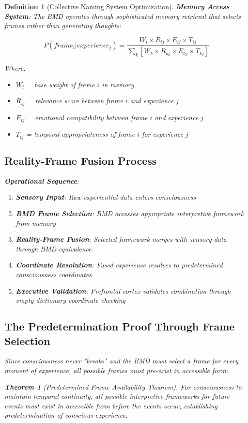 \documentclass[12pt]{article}
\newtheorem{theorem}{Theorem}
\newtheorem{definition}{Definition}
\begin{document}
\begin{definition}[Collective Naming System Optimization]
\textbf{Memory Access System}:
The BMD operates through sophisticated memory retrieval that selects frames rather than generating thoughts:

$$P(frame_i | experience_j) = \frac{W_i \times R_{ij} \times E_{ij} \times T_{ij}}{\sum_k[W_k \times R_{kj} \times E_{kj} \times T_{kj}]}$$

Where:
\begin{itemize}
\item $W_i$ = base weight of frame $i$ in memory
\item $R_{ij}$ = relevance score between frame $i$ and experience $j$
\item $E_{ij}$ = emotional compatibility between frame $i$ and experience $j$
\item $T_{ij}$ = temporal appropriateness of frame $i$ for experience $j$
\end{itemize}

\subsection{Reality-Frame Fusion Process}

\textbf{Operational Sequence}:
\begin{enumerate}
\item \textbf{Sensory Input}: Raw experiential data enters consciousness
\item \textbf{BMD Frame Selection}: BMD accesses appropriate interpretive framework from memory
\item \textbf{Reality-Frame Fusion}: Selected framework merges with sensory data through BMD equivalence
\item \textbf{Coordinate Resolution}: Fused experience resolves to predetermined consciousness coordinates
\item \textbf{Executive Validation}: Prefrontal cortex validates combination through empty dictionary coordinate checking
\end{enumerate}

\subsection{The Predetermination Proof Through Frame Selection}

Since consciousness never "breaks" and the BMD must select a frame for every moment of experience, all possible frames must pre-exist in accessible form:

\begin{theorem}[Predetermined Frame Availability Theorem]
For consciousness to maintain temporal continuity, all possible interpretive frameworks for future events must exist in accessible form before the events occur, establishing predetermination of conscious experience.
\end{theorem}


\end{definition}
\end{document}
